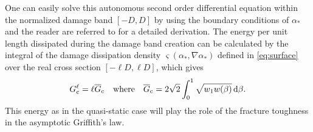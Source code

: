 One can easily solve this autonomous second order differential equation within the normalized damage band $[-D,D]$ by using the boundary conditions of $\alpha_*$ and the reader are referred to \cite{SicsicMarigo:2013} for a detailed derivation. The energy per unit length dissipated during the damage band creation can be calculated by the integral of the damage dissipation density $\varsigma(\alpha_*,\nabla\alpha_*)$ defined in \eqref{eq:surface} over the real cross section $[-\ell D,\ell D]$, which gives
\begin{equation} \label{eq:gcindamage}
G_\mathrm{c}^\ell=\ell\overline{G}_{\mathrm{c}}\quad\text{where}\quad\overline{G}_{\mathrm{c}}=2\sqrt{2}\int_0^1\sqrt{w_1w(\beta)}\,\mathrm{d}\beta.
\end{equation}
This energy as in the quasi-static case \cite{SicsicMarigo:2013} will play the role of the fracture toughness in the asymptotic Griffith's law.

